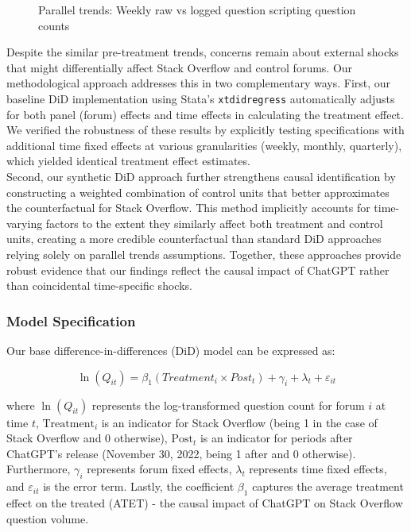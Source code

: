 \begin{figure}[H]
    \centering
    
    \caption{Parallel trends: Weekly raw vs logged question scripting question counts}
    \label{fig:paralleL_trend_trans}
\end{figure}

Despite the similar pre-treatment trends, concerns remain about external shocks that might differentially affect Stack Overflow and control forums. Our methodological approach addresses this in two complementary ways. First, our baseline DiD implementation using Stata's \texttt{xtdidregress} automatically adjusts for both panel (forum) effects and time effects in calculating the treatment effect. We verified the robustness of these results by explicitly testing specifications with additional time fixed effects at various granularities (weekly, monthly, quarterly), which yielded identical treatment effect estimates.\\

Second, our synthetic DiD approach further strengthens causal identification by constructing a weighted combination of control units that better approximates the counterfactual for Stack Overflow. This method implicitly accounts for time-varying factors to the extent they similarly affect both treatment and control units, creating a more credible counterfactual than standard DiD approaches relying solely on parallel trends assumptions. Together, these approaches provide robust evidence that our findings reflect the causal impact of ChatGPT rather than coincidental time-specific shocks.


\subsubsection{Model Specification}
Our base difference-in-differences (DiD) model can be expressed as:

\begin{equation}\label{eq:basedid}
\ln(Q_{it}) = \beta_1(Treatment_i \times Post_t) + \gamma_i + \lambda_t + \varepsilon_{it}
\end{equation}

where $\ln(Q_{it})$ represents the log-transformed question count for forum $i$ at time $t$, $\text{Treatment}_i$ is an indicator for Stack Overflow (being 1 in the case of Stack Overflow and 0 otherwise), $\text{Post}_t$ is an indicator for periods after ChatGPT's release (November 30, 2022, being 1 after and 0 otherwise).  Furthermore, $\gamma_i$ represents forum fixed effects, $\lambda_t$ represents time fixed effects, and $\varepsilon_{it}$ is the error term. Lastly, the coefficient $\beta_1$ captures the average treatment effect on the treated (ATET) - the causal impact of ChatGPT on Stack Overflow question volume.\\


